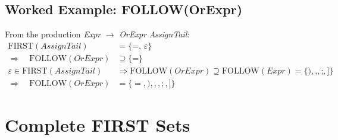 \documentclass[12pt,a4paper]{article}
\begin{document}
\subsection{Worked Example: FOLLOW(OrExpr)}

From the production \textit{Expr} $\to$ \textit{OrExpr} \textit{AssignTail}:
\begin{align*}
  \text{FIRST}(\textit{AssignTail}) &= \{\texttt{=},\, \varepsilon\}\\
  \Rightarrow\quad \text{FOLLOW}(\textit{OrExpr}) &\supseteq \{\texttt{=}\}\\
  \varepsilon \in \text{FIRST}(\textit{AssignTail}) &\Rightarrow
    \text{FOLLOW}(\textit{OrExpr}) \supseteq \text{FOLLOW}(\textit{Expr})
    = \{\texttt{)},\texttt{,},\texttt{;},\texttt{]}\}\\
  \Rightarrow\quad \text{FOLLOW}(\textit{OrExpr}) &= \{=, ), {,}, {;}, ]\}
\end{align*}

\section{Complete FIRST Sets}
\end{document}
